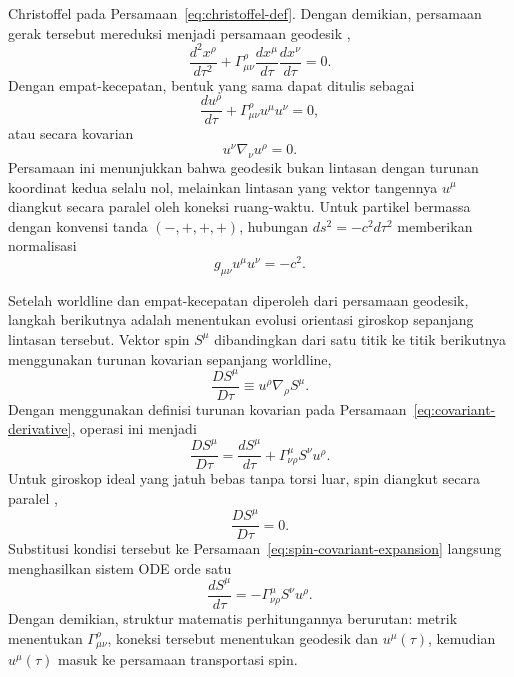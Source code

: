 Christoffel pada Persamaan~\eqref{eq:christoffel-def}. Dengan demikian,
persamaan gerak tersebut mereduksi menjadi persamaan geodesik
\parencite{Schutz2009FirstCourse,Carroll2004SpacetimeGeometry},
\begin{equation}
    \frac{d^2x^\rho}{d\tau^2}
    +\Gamma^\rho_{\mu\nu}
    \frac{dx^\mu}{d\tau}
    \frac{dx^\nu}{d\tau}=0.
    \label{eq:geodesic}
\end{equation}
Dengan empat-kecepatan, bentuk yang sama dapat ditulis sebagai
\begin{equation}
    \frac{du^\rho}{d\tau}
    +\Gamma^\rho_{\mu\nu}u^\mu u^\nu=0,
\end{equation}
atau secara kovarian
\begin{equation}
    u^\nu\nabla_\nu u^\rho=0.
    \label{eq:geodesic-covariant}
\end{equation}
Persamaan ini menunjukkan bahwa geodesik bukan lintasan dengan turunan
koordinat kedua selalu nol, melainkan lintasan yang vektor tangennya
$u^\mu$ diangkut secara paralel oleh koneksi ruang-waktu. Untuk partikel
bermassa dengan konvensi tanda $(-,+,+,+)$, hubungan
$ds^2=-c^2d\tau^2$ memberikan normalisasi
\begin{equation}
    g_{\mu\nu}u^\mu u^\nu=-c^2.
    \label{eq:normalisasi}
\end{equation}

Setelah worldline dan empat-kecepatan diperoleh dari persamaan geodesik,
langkah berikutnya adalah menentukan evolusi orientasi giroskop sepanjang
lintasan tersebut. Vektor spin $S^\mu$ dibandingkan dari satu titik ke
titik berikutnya menggunakan turunan kovarian sepanjang worldline,
\begin{equation}
    \frac{DS^\mu}{D\tau}
    \equiv
    u^\rho\nabla_\rho S^\mu.
    \label{eq:spin-worldline-derivative}
\end{equation}
Dengan menggunakan definisi turunan kovarian pada
Persamaan~\eqref{eq:covariant-derivative}, operasi ini menjadi
\begin{equation}
    \frac{DS^\mu}{D\tau}
    =\frac{dS^\mu}{d\tau}
    +\Gamma^\mu_{\nu\rho}S^\nu u^\rho.
    \label{eq:spin-covariant-expansion}
\end{equation}
Untuk giroskop ideal yang jatuh bebas tanpa torsi luar, spin diangkut
secara paralel \parencite{Misner1973Gravitation,Carroll2004SpacetimeGeometry},
\begin{equation}
    \frac{DS^\mu}{D\tau}=0.
    \label{eq:spin-parallel}
\end{equation}
Substitusi kondisi tersebut ke Persamaan~\eqref{eq:spin-covariant-expansion}
langsung menghasilkan sistem ODE orde satu
\begin{equation}
    \frac{dS^\mu}{d\tau}
    =-\Gamma^\mu_{\nu\rho}S^\nu u^\rho.
    \label{eq:spin-ode}
\end{equation}
Dengan demikian, struktur matematis perhitungannya berurutan: metrik
menentukan $\Gamma^\rho_{\mu\nu}$, koneksi tersebut menentukan geodesik dan
$u^\mu(\tau)$, kemudian $u^\mu(\tau)$ masuk ke persamaan transportasi spin.

